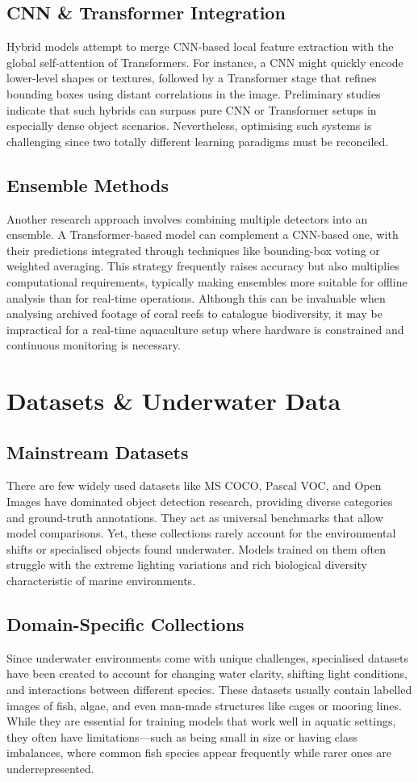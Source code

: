 \subsection{CNN \& Transformer Integration}
Hybrid models attempt to merge CNN-based local feature extraction with the global self-attention of Transformers. For instance, a CNN might quickly encode lower-level shapes or textures, followed by a Transformer stage that refines bounding boxes using distant correlations in the image. Preliminary studies indicate that such hybrids can surpass pure CNN or Transformer setups in especially dense object scenarios. Nevertheless, optimising such systems is challenging since two totally different learning paradigms must be reconciled.
\subsection{Ensemble Methods}
Another research approach involves combining multiple detectors into an ensemble. A Transformer-based model can complement a CNN-based one, with their predictions integrated through techniques like bounding-box voting or weighted averaging. This strategy frequently raises accuracy but also multiplies computational requirements, typically making ensembles more suitable for offline analysis than for real-time operations. Although this can be invaluable when analysing archived footage of coral reefs to catalogue biodiversity, it may be impractical for a real-time aquaculture setup where hardware is constrained and continuous monitoring is necessary.
\section{Datasets \& Underwater Data}
\subsection{Mainstream Datasets}
There are few widely used datasets like MS COCO, Pascal VOC, and Open Images have dominated object detection research, providing diverse categories and ground-truth annotations. They act as universal benchmarks that allow model comparisons. Yet, these collections rarely account for the environmental shifts or specialised objects found underwater. Models trained on them often struggle with the extreme lighting variations and rich biological diversity characteristic of marine environments.
\subsection{Domain-Specific Collections}
Since underwater environments come with unique challenges, specialised datasets have been created to account for changing water clarity, shifting light conditions, and interactions between different species. These datasets usually contain labelled images of fish, algae, and even man-made structures like cages or mooring lines. While they are essential for training models that work well in aquatic settings, they often have limitations—such as being small in size or having class imbalances, where common fish species appear frequently while rarer ones are underrepresented.
